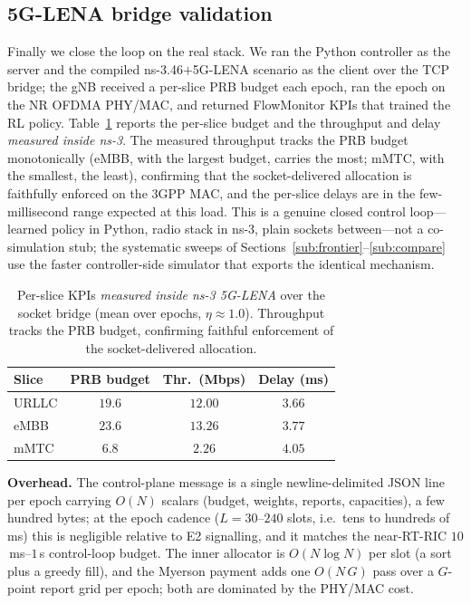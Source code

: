 \documentclass[conference]{IEEEtran}
\theoremstyle{definition}
\theoremstyle{remark}
\newcommand{\Ep}{L}
\newcommand{\Ntn}{N}
\newcommand{\load}{\eta}
\begin{document}
\subsection{5G-LENA bridge validation}\label{sub:ns3}
Finally we close the loop on the real stack. We ran the Python controller as the
server and the compiled ns-3.46$+$5G-LENA scenario as the client over the TCP
bridge; the gNB received a per-slice PRB budget each epoch, ran the epoch on the NR
OFDMA PHY/MAC, and returned FlowMonitor KPIs that trained the RL policy. Table~\ref{tab:ns3}
reports the per-slice budget and the throughput and delay \emph{measured inside
ns-3}. The measured throughput tracks the PRB budget monotonically (eMBB, with the
largest budget, carries the most; mMTC, with the smallest, the least), confirming
that the socket-delivered allocation is faithfully enforced on the 3GPP MAC, and the
per-slice delays are in the few-millisecond range expected at this load. This is a
genuine closed control loop---learned policy in Python, radio stack in ns-3, plain
sockets between---not a co-simulation stub; the systematic sweeps of
Sections~\ref{sub:frontier}--\ref{sub:compare} use the faster controller-side
simulator that exports the identical mechanism.

\begin{table}[t]
\caption{Per-slice KPIs \emph{measured inside ns-3 5G-LENA} over the socket bridge (mean over epochs, $\load{\approx}1.0$). Throughput tracks the PRB budget, confirming faithful enforcement of the socket-delivered allocation.}
\label{tab:ns3}
\centering
\small
\setlength{\tabcolsep}{5pt}
\begin{tabular}{@{}l c c c@{}}
\toprule
Slice & PRB budget & Thr.\ (Mbps) & Delay (ms) \\
\midrule
URLLC & $19.6$ & $12.00$ & $3.66$ \\
eMBB  & $23.6$ & $13.26$ & $3.77$ \\
mMTC  & $6.8$  & $2.26$  & $4.05$ \\
\bottomrule
\end{tabular}
\end{table}

\textbf{Overhead.} The control-plane message is a single newline-delimited JSON line
per epoch carrying $O(\Ntn)$ scalars (budget, weights, reports, capacities), a few
hundred bytes; at the epoch cadence ($\Ep=30$--$240$ slots, i.e.\ tens to hundreds of
ms) this is negligible relative to E2 signalling, and it matches the near-RT-RIC
$10$\,ms--$1$\,s control-loop budget. The inner allocator is $O(\Ntn\log\Ntn)$ per slot
(a sort plus a greedy fill), and the Myerson payment adds one $O(\Ntn\,G)$ pass over a
$G$-point report grid per epoch; both are dominated by the PHY/MAC cost.
\end{document}
